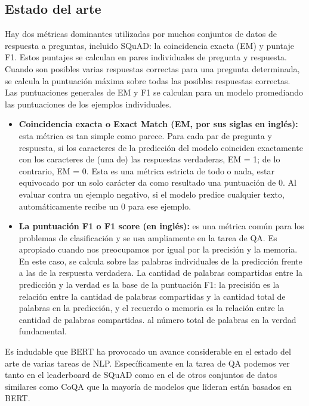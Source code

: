 
\subsection{Estado del arte}
\label{subsection-qa-estado-del-arte}

Hay dos métricas dominantes utilizadas por muchos conjuntos de datos de respuesta a preguntas, incluido SQuAD: la coincidencia exacta (EM) y puntaje F1. Estos puntajes se calculan en pares individuales de pregunta y respuesta. Cuando son posibles varias respuestas correctas para una pregunta determinada, se calcula la puntuación máxima sobre todas las posibles respuestas correctas. Las puntuaciones generales de EM y F1 se calculan para un modelo promediando las puntuaciones de los ejemplos individuales.

\begin{itemize}
    \item \textbf{Coincidencia exacta o Exact Match (EM, por sus siglas en inglés):} esta métrica es tan simple como parece. Para cada par de pregunta y respuesta, si los caracteres de la predicción del modelo coinciden exactamente con los caracteres de (una de) las respuestas verdaderas, EM = 1; de lo contrario, EM = 0. Esta es una métrica estricta de todo o nada, estar equivocado por un solo carácter da como resultado una puntuación de 0. Al evaluar contra un ejemplo negativo, si el modelo predice cualquier texto, automáticamente recibe un 0 para ese ejemplo.
    \item \textbf{La puntuación F1 o F1 score (en inglés):} es una métrica común para los problemas de clasificación y se usa ampliamente en la tarea de QA. Es apropiado cuando nos preocupamos por igual por la precisión y la memoria. En este caso, se calcula sobre las palabras individuales de la predicción frente a las de la respuesta verdadera. La cantidad de palabras compartidas entre la predicción y la verdad es la base de la puntuación F1: la precisión es la relación entre la cantidad de palabras compartidas y la cantidad total de palabras en la predicción, y el recuerdo o memoria es la relación entre la cantidad de palabras compartidas. al número total de palabras en la verdad fundamental.
\end{itemize}

Es indudable que BERT ha provocado un avance considerable en el estado del arte de varias tareas de NLP. Específicamente en la tarea de QA podemos ver tanto en el leaderboard  de SQuAD como en el de otros conjuntos de datos similares como CoQA \citep{CoQA_https://doi.org/10.48550/arxiv.1808.07042} que la mayoría de modelos que lideran están basados en BERT.


